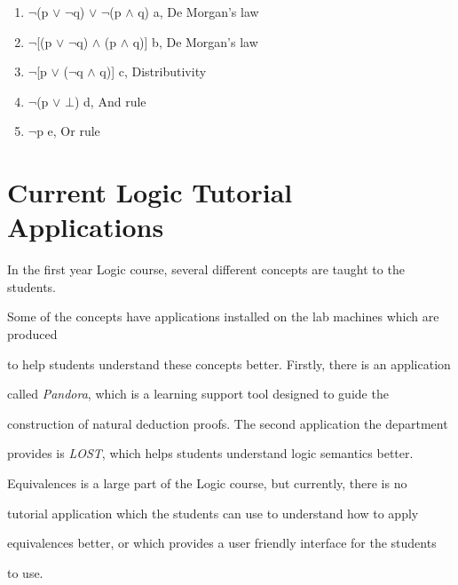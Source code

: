 \documentclass{report}
\begin{document}
\begin{enumerate}
\begin{enumerate}
    \item $\neg$(p $\lor$ $\neg$q) $\lor$ $\neg$(p $\land$ q) \hfill a, De Morgan's law

    \item $\neg$[(p $\lor$ $\neg$q) $\land$ (p $\land$ q)] \hfill b, De Morgan's law

    \item $\neg$[p $\lor$ ($\neg$q $\land$ q)] \hfill c, Distributivity

    \item $\neg$(p $\lor$ $\bot$) \hfill d, And rule

    \item $\neg$p \hfill e, Or rule

  \end{enumerate}

\end{enumerate}



\section{Current Logic Tutorial Applications}



In the first year Logic course, several different concepts are taught to the students.

Some of the concepts have applications installed on the lab machines which are produced

to help students understand these concepts better. Firstly, there is an application

called \emph{Pandora}, which is a learning support tool designed to guide the

construction of natural deduction proofs. The second application the department

provides is \emph{LOST}, which helps students understand logic semantics better. 



Equivalences is a large part of the Logic course, but currently, there is no

tutorial application which the students can use to understand how to apply

equivalences better, or which provides a user friendly interface for the students 

to use. 



\end{document}
